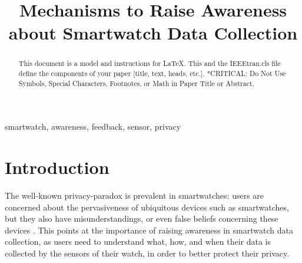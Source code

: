\documentclass[conference, a4paper, 10pt, twocolumn]{IEEEtran}
\begin{document}
\title{Mechanisms to Raise Awareness about Smartwatch Data Collection}

\author{
	\and
}

\maketitle
\thispagestyle{plain}
\pagestyle{plain}


\begin{abstract}
This document is a model and instructions for \LaTeX.
This and the IEEEtran.cls file define the components of your paper [title, text, heads, etc.]. *CRITICAL: Do Not Use Symbols, Special Characters, Footnotes, 
or Math in Paper Title or Abstract.
\end{abstract}

\begin{IEEEkeywords}
smartwatch, awareness, feedback, sensor, privacy
\end{IEEEkeywords}

\section{Introduction}
The well-known privacy-paradox \cite{williams2019smart,patil2015interrupt} is prevalent in smartwatches: users are concerned about the pervasiveness of ubiquitous devices such as smartwatches, but they also have misunderstandings, or even false beliefs concerning these devices \cite{udoh2016privacy}. This points at the importance of raising awareness in smartwatch data collection, as users need to understand what, how, and when their data is collected by the sensors of their watch, in order to better protect their privacy. 
\end{document}
